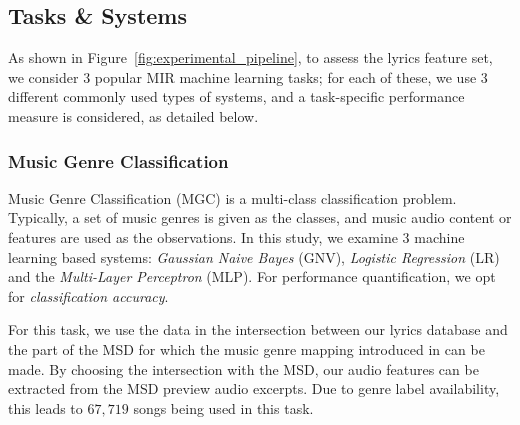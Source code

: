 \documentclass{article}
\begin{document}
\subsection{Tasks \& Systems}\label{sec:exp:task}

As shown in Figure~\ref{fig:experimental_pipeline}, to assess the lyrics feature set, we consider $3$ popular MIR machine learning tasks; for each of these, we use $3$ different commonly used types of systems, and a task-specific performance measure is considered, as detailed below.

\subsubsection{Music Genre Classification}\label{sec:exp:task:genre}
Music Genre Classification (MGC) is a multi-class classification problem. Typically, a set of music genres is given as the classes, and music audio content or features are used as the observations. In this study, we examine $3$ machine learning based systems: \emph{Gaussian Naive Bayes} (GNV), \emph{Logistic Regression} (LR) and the \emph{Multi-Layer Perceptron} (MLP).
For performance quantification, we opt for \emph{classification accuracy}.

For this task, we use the data in the intersection between our lyrics database and the part of the MSD for which the music genre mapping introduced in \cite{DBLP:conf/ismir/Schreiber15} can be made. By choosing the intersection with the MSD, our audio features can be extracted from the MSD preview audio excerpts. Due to genre label availability, this leads to $67,719$ songs being used in this task.
\end{document}
